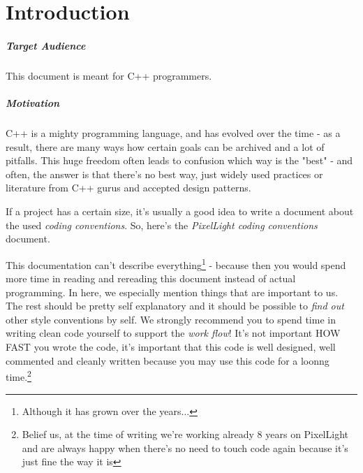 \chapter{Introduction}


\paragraph{Target Audience}
This document is meant for C++ programmers.


\paragraph{Motivation}
C++ is a mighty programming language, and has evolved over the time - as a result, there are many ways how certain goals can be archived and a lot of pitfalls. This huge freedom often leads to confusion which way is the "best" - and often, the answer is that there's no best way, just widely used practices or literature from C++ gurus and accepted design patterns.

If a project has a certain size, it's usually a good idea to write a document about the used \emph{coding conventions}. So, here's the \emph{PixelLight coding conventions} document.

This documentation can't describe everything\footnote{Although it has grown over the years...} - because then you would spend more time in reading and rereading this document instead of actual programming. In here, we especially mention things that are important to us. The rest should be pretty self explanatory and it should be possible to \emph{find out} other style conventions by self. We strongly recommend you to spend time in writing clean code yourself to support the \emph{work flow}! It's not important HOW FAST you wrote the code, it's important that this code is well designed, well commented and cleanly written because you may use this code for a loonng time.\footnote{Belief us, at the time of writing we're working already 8 years on PixelLight and are always happy when there's no need to touch code again because it's just fine the way it is}
